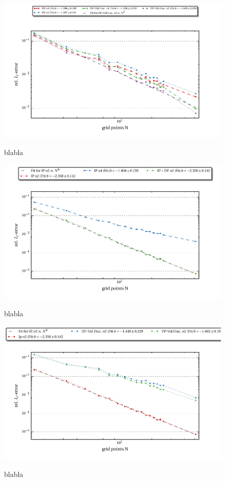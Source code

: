 \begin{figure}[!pb]
  \centering
  \includegraphics{gfx/immersed_boundary/hpflow/theo/df.pdf}\label{fig:hpflow_dfgc_theo}
  \caption{blabla}
\end{figure}


\begin{figure}[!pt]
  \centering
  \includegraphics{gfx/immersed_boundary/hpflow/theo/ip.pdf}\label{fig:hpflow_ipgc_theo}
  \caption{blabla}
\end{figure}

\begin{figure}[!pb]
  \centering
  \includegraphics{gfx/immersed_boundary/hpflow/theo/all.pdf}\label{fig:hpflow_allgc_theo}
  \caption{blabla}
\end{figure}

